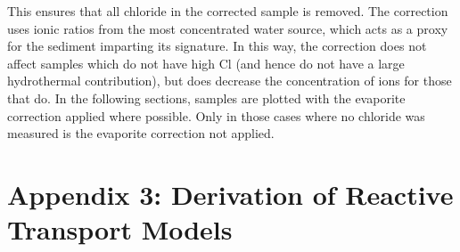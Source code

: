 This ensures that all chloride in the corrected sample is removed. The correction uses ionic ratios from the most concentrated water source, which acts as a proxy for the sediment imparting its signature.  In this way, the correction does not affect samples which do not have high Cl (and hence do not have a large hydrothermal contribution), but does decrease the concentration of ions for those that do. In the following sections, samples are plotted with the evaporite correction applied where possible. Only in those cases where no chloride was measured is the evaporite correction not applied.

\newpage


\section*{Appendix 3: Derivation of Reactive Transport Models}


